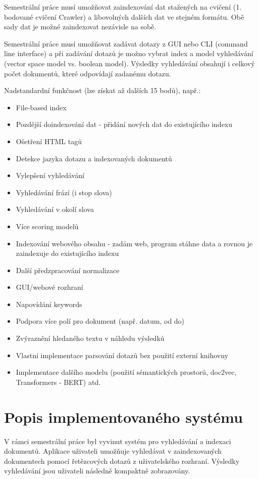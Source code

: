 \documentclass{article}
\begin{document}
Semestrální práce musí umožňovat zaindexování dat stažených na cvičení (1. bodované cvičení Crawler) a libovolných dalších dat ve stejném formátu. Obě sady dat je možné zaindexovat nezávisle na sobě.

Semestrální práce musí umožňovat zadávat dotazy z GUI nebo CLI (command line interface) a při zadávání dotazů je možno vybrat index a model vyhledávání (vector space model vs. boolean model). Výsledky vyhledávání obsahují i celkový počet dokumentů, které odpovídají zadanému dotazu.

 

Nadstandardní funkčnost (lze získat až dalších 15 bodů), např.:
\begin{itemize}
    \item File-based index
    \item Pozdější doindexování dat - přidání nových dat do existujícího indexu
    \item Ošetření HTML tagů
    \item Detekce jazyka dotazu a indexovaných dokumentů
    \item Vylepšení vyhledávání
    \item Vyhledávání frází (i stop slova)
    \item Vyhledávání v okolí slova
    \item Více scoring modelů
    \item Indexování webového obsahu - zadám web, program stáhne data a rovnou je zaindexuje do existujícího indexu
    \item Další předzpracování normalizace
    \item GUI/webové rozhraní
    \item Napovídání keywords
    \item Podpora více polí pro dokument (např. datum, od do)
    \item Zvýraznění hledaného textu v náhledu výsledků
    \item Vlastní implementace parsování dotazů bez použití externí knihovny
    \item Implementace dalšího modelu (použití sémantických prostorů, doc2vec, Transformers - BERT) atd.
\end{itemize}

\section{Popis implementovaného systému}
V rámci semestrální práce byl vyvinut systém pro vyhledávání a indexaci dokumentů. Aplikace uživateli umožňuje vyhledávat v zaindexovaných dokumentech pomocí řetězcových dotazů z uživatelského rozhraní. Výsledky vyhledávání jsou uživateli následně kompaktně zobrazovány. 
\end{document}
